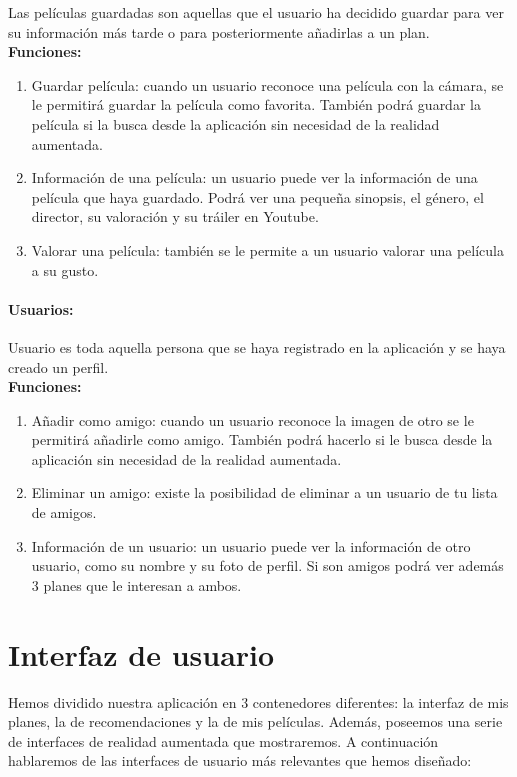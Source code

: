 Las películas guardadas son aquellas que el usuario ha decidido guardar para ver su información más tarde o para posteriormente añadirlas a un plan.
\\
\textbf{Funciones:}
\begin{enumerate}
    \item Guardar película: cuando un usuario reconoce una película con la cámara, se le permitirá guardar la película como favorita. También podrá guardar la película si la busca desde la aplicación sin necesidad de la realidad aumentada.
    \item Información de una película: un usuario puede ver la información de una película que haya guardado. Podrá ver una pequeña sinopsis, el género, el director, su valoración y su tráiler en Youtube.
    \item Valorar una película: también se le permite a un usuario valorar una película a su gusto.
\end{enumerate} 
\paragraph{\large Usuarios:\\}
Usuario es toda aquella persona que se haya registrado en la aplicación y se haya creado un perfil.
\\
\textbf{Funciones:}
\begin{enumerate}
    \item Añadir como amigo: cuando un usuario reconoce la imagen de otro se le permitirá añadirle como amigo. También podrá hacerlo si le busca desde la aplicación sin necesidad de la realidad aumentada.
    \item Eliminar un amigo: existe la posibilidad de eliminar a un usuario de tu lista de amigos.
    \item Información de un usuario: un usuario puede ver la información de otro usuario, como su nombre y su foto de perfil. Si son amigos podrá ver además 3 planes que le interesan a ambos.
\end{enumerate} 

\section{Interfaz de usuario}
\label{makereference3.4}

Hemos dividido nuestra aplicación en 3 contenedores diferentes: la interfaz de mis planes, la de recomendaciones y la de mis películas. Además, poseemos una serie de interfaces de realidad aumentada que mostraremos. A continuación hablaremos
de las interfaces de usuario más relevantes que hemos diseñado:
